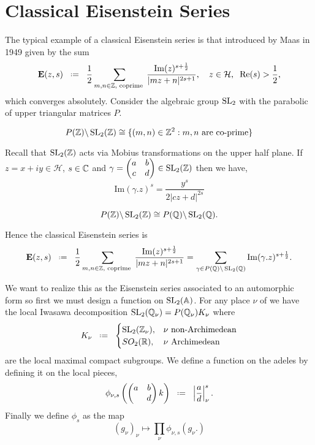 \section{Classical Eisenstein Series}
The typical example of a classical Eisenstein series is that introduced by Maas in 1949 given by the sum \cite{lapidPerspectivesEisensteinSeries2022} 
\[\mathbf{E}(z, s) \defeq \frac{1}{2} \sum_{m,n\in \Z, \text{ coprime }} \frac{\mathrm{Im}(z)^{s+\frac{1}{2}}}{|mz+n|^{2s+1}}, \quad z\in \mathcal{H},\;\; \mathrm{Re}(s)>\frac{1}{2},\]
which converges absolutely. Consider the algebraic group \(\operatorname{SL}_2\) with the parabolic of upper triangular matrices \(P\).

\begin{Lemma}
	\[P(\Z) \backslash \SL_2(\Z) \cong \{(m,n)\in \Z^2 : m,n \text{ are co-prime}\}\]
\end{Lemma}

\begin{Lemma}
	Recall that \(\SL_2(\Z)\) acts via Mobius transformations on the upper half plane. If \(z= x+ iy \in \mathcal{H}\), \(s\in \C\) and \(\gamma = \begin{pmatrix}
	a & b\\ c& d \end{pmatrix}\in \SL_2(\Z)\) then we have,
	\[\mathrm{Im}(\gamma.z)^s = \frac{y^s}{2|cz + d|^{2s}}\]
\end{Lemma}

\begin{Lemma}
	\[P(\Z) \backslash \SL_2(\Z) \cong P(\Q) \backslash \SL_2(\Q). \]
\end{Lemma}

Hence the classical Eisenstein series is 
\[\mathbf{E}(z, s) \defeq \frac{1}{2} \sum_{m,n\in \Z, \text{ coprime }} \frac{\mathrm{Im}(z)^{s+\frac{1}{2}}}{|mz+n|^{2s+1}} = \sum_{\gamma\in P(\Q)\backslash \SL_2(\Q)} \mathrm{Im}(\gamma.z)^{s+\frac{1}{2}}.\]

We want to realize this as the Eisenstein series associated to an automorphic form so first we must design a function on \(\SL_2(\A)\). For any place \(\nu\) of \Q we have the local Iwasawa decomposition \(\SL_2(\Q_\nu) = P(\Q_\nu) K_\nu\) where 
\[K_\nu \defeq \begin{cases}
	\SL_2(\Z_\nu), & \nu \text{ non-Archimedean}\\
	SO_2(\R), & \nu \text{ Archimedean}
\end{cases}\]
 are the local maximal compact subgroups. We define a function on the adeles by defining it on the local pieces,
 \[\phi_{\nu, s}\left(\begin{pmatrix}
 	a & b\\ & d
 \end{pmatrix}k\right) \defeq \left| \frac{a}{d} \right|_\nu^s .\]
 Finally we define \(\phi_s\) as the map 
 \[(g_\nu)_{\nu} \mapsto \prod_\nu \phi_{\nu,s}(g_\nu.)\]
 
